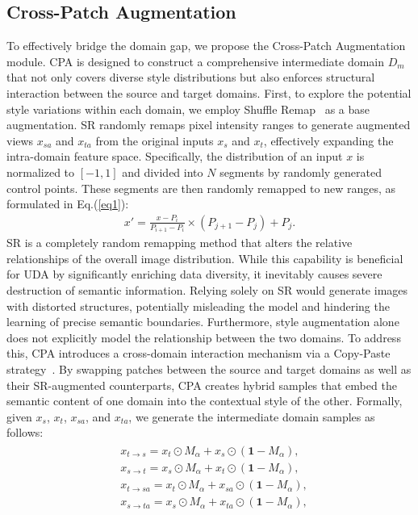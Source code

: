 \subsection{Cross-Patch Augmentation}
To effectively bridge the domain gap, we propose the Cross-Patch Augmentation module. CPA is designed to construct a comprehensive intermediate domain $D_m$ that not only covers diverse style distributions but also enforces structural interaction between the source and target domains.
First, to explore the potential style variations within each domain, we employ Shuffle Remap~\cite{kong2023indescribable} as a base augmentation. SR randomly remaps pixel intensity ranges to generate augmented views $x_{sa}$ and $x_{ta}$ from the original inputs $x_s$ and $x_t$, effectively expanding the intra-domain feature space.
Specifically, the distribution of an input $x$ is normalized to $[-1, 1]$ and divided into $N$ segments by randomly generated control points. These segments are then randomly remapped to new ranges, as formulated in Eq.(\ref{eq1}):
\begin{align}  \label{eq1}
    x'=\frac{x-P_{i}}{P_{i+1}-P_{i}} \times  (P_{j+1}-P_{j}) + P_{j}.
\end{align}
SR is a completely random remapping method that alters the relative relationships of the overall image distribution. While this capability is beneficial for UDA by significantly enriching data diversity, it inevitably causes severe destruction of semantic information. Relying solely on SR would generate images with distorted structures, potentially misleading the model and hindering the learning of precise semantic boundaries. Furthermore, style augmentation alone does not explicitly model the relationship between the two domains.
To address this, CPA introduces a cross-domain interaction mechanism via a Copy-Paste strategy~\cite{bai2023bidirectional}. By swapping patches between the source and target domains as well as their SR-augmented counterparts, CPA creates hybrid samples that embed the semantic content of one domain into the contextual style of the other. Formally, given $x_s$, $x_t$, $x_{sa}$, and $x_{ta}$, we generate the intermediate domain samples as follows:
\begin{align}\label{eq2}
    \begin{split} 
       & x_{t\to s} = x_{t} \odot \mathit{M}_{\alpha} + x_{s} \odot (\mathbf{1} - \mathit{M}_{\alpha}),  \\
       & x_{s\to t} = x_{s} \odot \mathit{M}_{\alpha} + x_{t} \odot (\mathbf{1} - \mathit{M}_{\alpha}), \\
       & x_{t\to sa} = x_{t} \odot \mathit{M}_{\alpha} + x_{sa} \odot (\mathbf{1} - \mathit{M}_{\alpha}),  \\
       & x_{s\to ta} = x_{s} \odot \mathit{M}_{\alpha} + x_{ta} \odot (\mathbf{1} - \mathit{M}_{\alpha}), 
    \end{split} 
\end{align}

